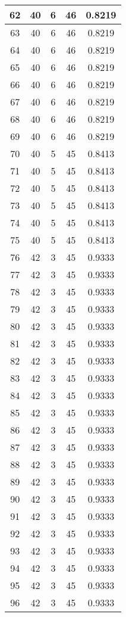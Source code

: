 \documentclass[letterpaper, 12pt]{article}
\begin{document}
\begin{longtable}{|c|c|c|c|c|}
\hline
62 & 40 & 6 & 46 & 0.8219 \\
\hline
63 & 40 & 6 & 46 & 0.8219 \\
\hline
64 & 40 & 6 & 46 & 0.8219 \\
\hline
65 & 40 & 6 & 46 & 0.8219 \\
\hline
66 & 40 & 6 & 46 & 0.8219 \\
\hline
67 & 40 & 6 & 46 & 0.8219 \\
\hline
68 & 40 & 6 & 46 & 0.8219 \\
\hline
69 & 40 & 6 & 46 & 0.8219 \\
\hline
70 & 40 & 5 & 45 & 0.8413 \\
\hline
71 & 40 & 5 & 45 & 0.8413 \\
\hline
72 & 40 & 5 & 45 & 0.8413 \\
\hline
73 & 40 & 5 & 45 & 0.8413 \\
\hline
74 & 40 & 5 & 45 & 0.8413 \\
\hline
75 & 40 & 5 & 45 & 0.8413 \\
\hline
76 & 42 & 3 & 45 & 0.9333 \\
\hline
77 & 42 & 3 & 45 & 0.9333 \\
\hline
78 & 42 & 3 & 45 & 0.9333 \\
\hline
79 & 42 & 3 & 45 & 0.9333 \\
\hline
80 & 42 & 3 & 45 & 0.9333 \\
\hline
81 & 42 & 3 & 45 & 0.9333 \\
\hline
82 & 42 & 3 & 45 & 0.9333 \\
\hline
83 & 42 & 3 & 45 & 0.9333 \\
\hline
84 & 42 & 3 & 45 & 0.9333 \\
\hline
85 & 42 & 3 & 45 & 0.9333 \\
\hline
86 & 42 & 3 & 45 & 0.9333 \\
\hline
87 & 42 & 3 & 45 & 0.9333 \\
\hline
88 & 42 & 3 & 45 & 0.9333 \\
\hline
89 & 42 & 3 & 45 & 0.9333 \\
\hline
90 & 42 & 3 & 45 & 0.9333 \\
\hline
91 & 42 & 3 & 45 & 0.9333 \\
\hline
92 & 42 & 3 & 45 & 0.9333 \\
\hline
93 & 42 & 3 & 45 & 0.9333 \\
\hline
94 & 42 & 3 & 45 & 0.9333 \\
\hline
95 & 42 & 3 & 45 & 0.9333 \\
\hline
96 & 42 & 3 & 45 & 0.9333 \\

\end{longtable}
\end{document}
